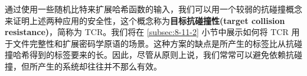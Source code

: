 \begin{snote}[不依赖抗碰撞的安全性。]
通过使用一些随机比特来扩展哈希函数的输入，我们可以用一个较弱的抗碰撞概念来证明上述两种应用的安全性，这个概念称为\textbf{目标抗碰撞性(target collision resistance)}，简称为 TCR。我们将在 \ref{subsec:8-11-2} 小节中展示如何将 TCR 用于文件完整性和扩展密码学原语的场景。这种方案的缺点是所产生的标签比从抗碰撞哈希得到的标签要来的长。因此，尽管从原则上说，我们常常可以避免依赖抗碰撞，但所产生的系统却往往并不那么有效。
\end{snote}














